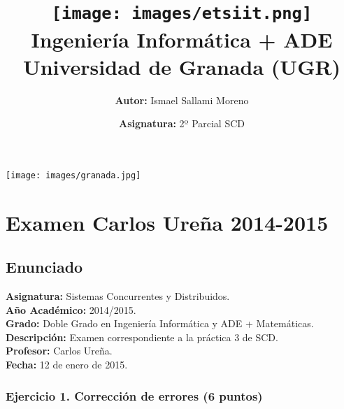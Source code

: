 \documentclass[a4paper,12pt]{article}
\title{
    \vspace{-2cm}
    \texttt{[image: images/etsiit.png]} \\ %
    \LARGE Ingeniería Informática + ADE\\
    \large Universidad de Granada (UGR)\\[1cm]
}
\author{\textbf{Autor:} Ismael Sallami Moreno}
\date{\textbf{Asignatura:} 2º Parcial SCD}
\begin{document}
\maketitle
\thispagestyle{empty}

\begin{center}
    \texttt{[image: images/granada.jpg]} \\ %
    \vfill
\end{center}

\newpage

\tableofcontents
\newpage

\section{Examen Carlos Ureña 2014-2015}  

\subsection{Enunciado}
\noindent
\textbf{Asignatura:} Sistemas Concurrentes y Distribuidos. \\
\textbf{Año Académico:} 2014/2015. \\
\textbf{Grado:} Doble Grado en Ingeniería Informática y ADE + Matemáticas. \\
\textbf{Descripción:} Examen correspondiente a la práctica 3 de SCD. \\
\textbf{Profesor:} Carlos Ureña. \\
\textbf{Fecha:} 12 de enero de 2015. \\


\subsubsection{Ejercicio 1. Corrección de errores (6 puntos)}
\end{document}
